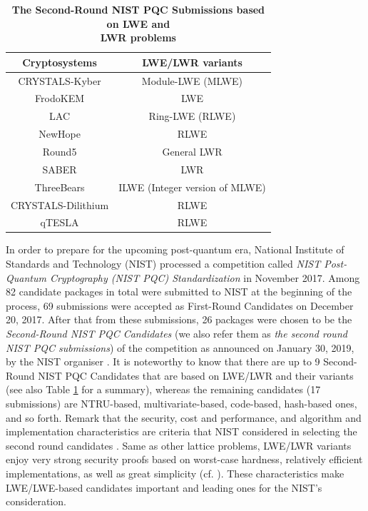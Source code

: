\documentclass{cta-author}
\begin{document}
\begin{table}[pt]
	\caption{\textbf{The Second-Round NIST PQC Submissions based on LWE and\\ LWR problems}} 
	\centering
	\small\addtolength{\tabcolsep}{0pt}
	
	\begin{tabular}{ c | c  }
		\hline
		
		\textbf{Cryptosystems}&\textbf{LWE/LWR variants}\\
		\hline
		\hline
		CRYSTALS-Kyber&Module-LWE (MLWE)\\
		FrodoKEM& LWE\\
		LAC&Ring-LWE (RLWE)\\
		NewHope&RLWE\\
		
		Round5 &General LWR \\
		SABER&LWR\\
		ThreeBears&ILWE (Integer version of MLWE) \\
		CRYSTALS-Dilithium&RLWE\\
		qTESLA&RLWE\\
		\hline
	\end{tabular}
	\label{table:21}
\end{table}

In order to prepare for the upcoming post-quantum era, National Institute of Standards and Technology (NIST) processed a competition called \textit{NIST Post-Quantum Cryptography (NIST PQC) Standardization} in November 2017. Among 82 candidate packages in total were submitted to NIST at the beginning of the process, 69 submissions were accepted as First-Round Candidates on December 20, 2017. After that from these submissions, 26 packages were chosen to be the \textit{Second-Round NIST PQC Candidates} (we also refer them as \textit{the second round NIST PQC submissions}) of the competition as announced on January 30, 2019, by the NIST organiser \cite{AAA+19}.  It is noteworthy to know that there are up to 9 Second-Round NIST PQC Candidates that are based on LWE/LWR and their variants (see also Table \ref{table:21} for a summary), whereas the remaining candidates (17 submissions) are NTRU-based, multivariate-based, code-based, hash-based ones, and so forth. Remark that the security, cost and performance, and algorithm and implementation characteristics are criteria that NIST considered in selecting the second round candidates \cite[Subsection 2.3]{AAA+19}. Same as other lattice problems, LWE/LWR variants enjoy very strong security proofs based on worst-case hardness, relatively efficient implementations, as well as great simplicity (cf. \cite{MR09}). These characteristics make LWE/LWE-based candidates important and leading ones for the NIST's consideration.
\end{document}
